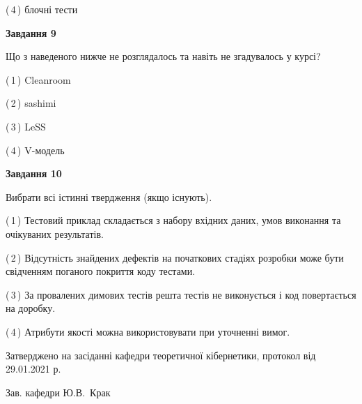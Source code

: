 \documentclass[10pt, ukrainian]{article}
\begin{document}
{\begin {large}
(\,4\,) блочні тести%


{\begin {center}\textbf{Завдання 9}\end {center}}\par
Що з наведеного нижче не розглядалось та навіть не згадувалось у курсі?\par
\vspace{2mm}



(\,1\,) Cleanroom%



(\,2\,) sashimi%



(\,3\,) LeSS%



(\,4\,) V-модель%


{\begin {center}\textbf{Завдання 10}\end {center}}\par
Вибрати всі істинні твердження (якщо існують).\par
\vspace{2mm}



(\,1\,) Тестовий приклад складається з набору вхідних даних, умов виконання та очікуваних результатів.%



(\,2\,) Відсутність знайдених дефектів на початкових стадіях розробки може бути свідченням поганого покриття коду тестами.%



(\,3\,) За провалених димових тестів решта тестів не виконується і код повертається на доробку.%



(\,4\,) Атрибути якості можна використовувати при уточненні вимог.%



\end {large}}
{\vspace{5mm}\smallskip \begin {small} Затверджено на засіданні кафедри теоретичної кібернетики, протокол  від   29.01.2021 р.\par\smallskip\smallskip
{\parbox {6.5 cm}{Зав. кафедри \dotfill Ю.В.~Крак}} \end{small}}
\newpage
\end{document}
